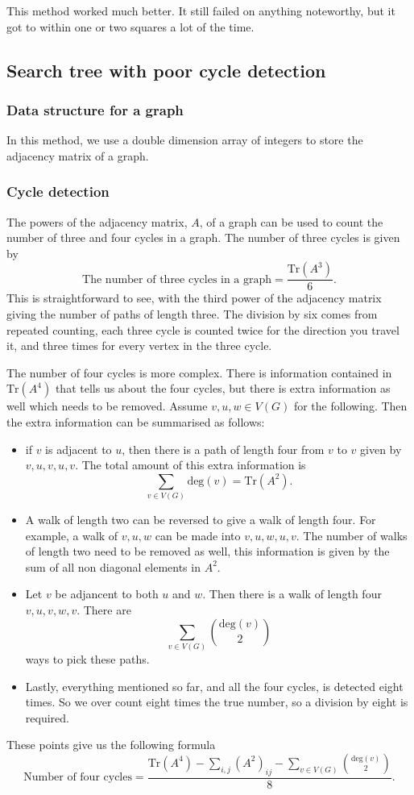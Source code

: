 \documentclass[a4paper]{article}
\renewcommand{\deg}[1]{\text{deg}#1}
\newcommand{\Tr}{\text{Tr}}
\begin{document}
This method worked much better. It still failed on anything noteworthy, but it got to within one or two squares a lot of the time.

\subsection{Search tree with poor cycle detection}
\label{sec:tree_poor_cycle}
\subsubsection{Data structure for a graph}
In this method, we use a double dimension array of integers to store the adjacency matrix of a graph.

\subsubsection{Cycle detection}
The powers of the adjacency matrix, $A$, of a graph can be used to count the number of three and four cycles in a graph. The number of three cycles is given by
\begin{equation}
\label{eqn:number_of_triangles}
\text{The number of three cycles in a graph}=\frac{\Tr(A^3)}{6}.
\end{equation}
This is straightforward to see, with the third power of the adjacency matrix giving the number of paths of length three. The division by six comes from repeated counting, each three cycle is counted twice for the direction you travel it, and three times for every vertex in the three cycle.

The number of four cycles is more complex. There is information contained in $\Tr(A^4)$ that tells us about the four cycles, but there is extra information as well which needs to be removed. Assume $v,u,w\in V(G)$ for the following. Then the extra information can be summarised as follows:
\begin{itemize}
\item if $v$ is adjacent to $u$, then there is a path of length four from $v$ to $v$ given by $v,u,v,u,v$. The total amount of this extra information is $$\sum_{v\in V(G)}\deg(v)=\Tr(A^2).$$
\item A walk of length two can be reversed to give a walk of length four. For example, a walk of $v,u,w$ can be made into $v,u,w,u,v$. The number of walks of length two need to be removed as well, this information is given by the sum of all non diagonal elements in $A^2$.
\item Let $v$ be adjancent to both $u$ and $w$. Then there is a walk of length four $v,u,v,w,v$. There are $$\sum_{v\in V(G)}\binom{\deg(v)}{2}$$ ways to pick these paths.
\item Lastly, everything mentioned so far, and all the four cycles, is detected eight times. So we over count eight times the true number, so a division by eight is required.
\end{itemize}
These points give us the following formula
\begin{equation}
\label{eqn:number_of_squares}
\text{Number of four cycles}=\frac{\Tr(A^4)-\sum_{i,j}(A^2)_{ij}-\sum_{v\in V(G)}\binom{\deg(v)}{2}}{8}.
\end{equation}
\end{document}

